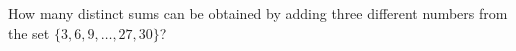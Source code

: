 How many distinct sums can be obtained by adding three different numbers from the set $\{3,6,9,\ldots,27,30\}$?
